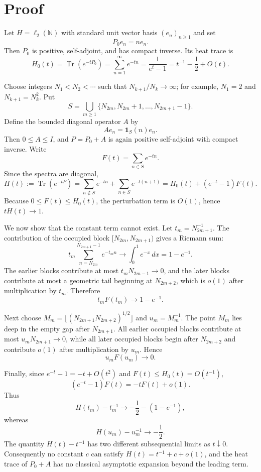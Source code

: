 \documentclass[11pt]{article}
\newcommand{\N}{\mathbb N}
\newcommand{\ellTwo}{\ell_2(\N)}
\newcommand{\Tr}{\operatorname{Tr}}
\begin{document}
\section*{Proof}

Let $H=\ellTwo$ with standard unit vector basis $(e_n)_{n\geq1}$ and set
\[
  P_0 e_n = n e_n .
\]
Then $P_0$ is positive, self-adjoint, and has compact inverse.  Its heat trace
is
\[
  H_0(t)=\Tr(e^{-tP_0})=\sum_{n=1}^{\infty}e^{-tn}
       =\frac{1}{e^t-1}
       =t^{-1}-\frac12+O(t).
\]

Choose integers $N_1<N_2<\cdots$ such that $N_{k+1}/N_k\to\infty$; for
example, $N_1=2$ and $N_{k+1}=N_k^2$.  Put
\[
  S=\bigcup_{m\geq1}\{N_{2m},N_{2m}+1,\ldots,N_{2m+1}-1\}.
\]
Define the bounded diagonal operator $A$ by
\[
  A e_n=\mathbf 1_S(n)e_n .
\]
Then $0\leq A\leq I$, and $P=P_0+A$ is again positive self-adjoint with
compact inverse.  Write
\[
  F(t)=\sum_{n\in S}e^{-tn}.
\]
Since the spectra are diagonal,
\[
  H(t):=\Tr(e^{-tP})
  =\sum_{n\notin S}e^{-tn}+\sum_{n\in S}e^{-t(n+1)}
  =H_0(t)+(e^{-t}-1)F(t).
\]
Because $0\leq F(t)\leq H_0(t)$, the perturbation term is $O(1)$, hence
$tH(t)\to1$.

We now show that the constant term cannot exist.  Let
$t_m=N_{2m+1}^{-1}$.  The contribution of the occupied block
$[N_{2m},N_{2m+1})$ gives a Riemann sum:
\[
  t_m\sum_{n=N_{2m}}^{N_{2m+1}-1} e^{-t_m n}
  \longrightarrow \int_0^1 e^{-x}\,dx
  =1-e^{-1}.
\]
The earlier blocks contribute at most $t_m N_{2m-1}\to0$, and the later blocks
contribute at most a geometric tail beginning at $N_{2m+2}$, which is
$o(1)$ after multiplication by $t_m$.  Therefore
\[
  t_m F(t_m)\longrightarrow 1-e^{-1}.
\]

Next choose $M_m=\lfloor (N_{2m+1}N_{2m+2})^{1/2}\rfloor$ and
$u_m=M_m^{-1}$.  The point $M_m$ lies deep in the empty gap after
$N_{2m+1}$.  All earlier occupied blocks contribute at most
$u_m N_{2m+1}\to0$, while all later occupied blocks begin after
$N_{2m+2}$ and contribute $o(1)$ after multiplication by $u_m$.  Hence
\[
  u_m F(u_m)\longrightarrow0.
\]

Finally, since $e^{-t}-1=-t+O(t^2)$ and $F(t)\leq H_0(t)=O(t^{-1})$,
\[
  (e^{-t}-1)F(t)=-tF(t)+o(1).
\]
Thus
\[
  H(t_m)-t_m^{-1}\longrightarrow -\frac12-(1-e^{-1}),
\]
whereas
\[
  H(u_m)-u_m^{-1}\longrightarrow -\frac12.
\]
The quantity $H(t)-t^{-1}$ has two different subsequential limits as
$t\downarrow0$.  Consequently no constant $c$ can satisfy
$H(t)=t^{-1}+c+o(1)$, and the heat trace of $P_0+A$ has no classical
asymptotic expansion beyond the leading term.
\end{document}
